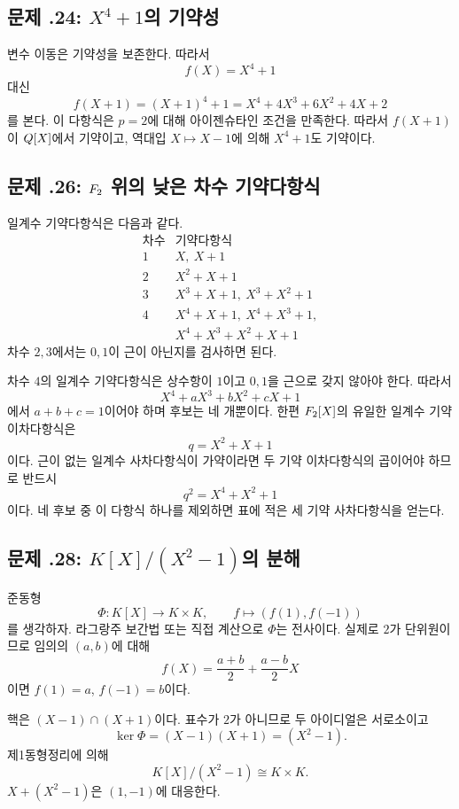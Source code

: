 \subsection*{문제 \thechapter.24: $X^4+1$의 기약성}

\begin{solution}
변수 이동은 기약성을 보존한다. 따라서
\[
 f(X)=X^4+1
\]
대신
\[
 f(X+1)=(X+1)^4+1
 =X^4+4X^3+6X^2+4X+2
\]
를 본다. 이 다항식은 $p=2$에 대해 아이젠슈타인 조건을 만족한다. 따라서 $f(X+1)$이 $Q[X]$에서 기약이고, 역대입 $X\mapsto X-1$에 의해 $X^4+1$도 기약이다.
\end{solution}

\subsection*{문제 \thechapter.26: $F_2$ 위의 낮은 차수 기약다항식}

\begin{solution}
일계수 기약다항식은 다음과 같다.
\[
\begin{array}{c|l}
\text{차수}&\text{기약다항식}\\
\hline
1&X,\ X+1\\
2&X^2+X+1\\
3&X^3+X+1,\ X^3+X^2+1\\
4&X^4+X+1,\ X^4+X^3+1,\\
 &X^4+X^3+X^2+X+1
\end{array}
\]
차수 $2,3$에서는 $0,1$이 근이 아닌지를 검사하면 된다.

차수 $4$의 일계수 기약다항식은 상수항이 $1$이고 $0,1$을 근으로 갖지 않아야 한다. 따라서
\[
  X^4+aX^3+bX^2+cX+1
\]
에서 $a+b+c=1$이어야 하며 후보는 네 개뿐이다. 한편 $F_2[X]$의 유일한 일계수 기약 이차다항식은
\[
  q=X^2+X+1
\]
이다. 근이 없는 일계수 사차다항식이 가약이라면 두 기약 이차다항식의 곱이어야 하므로 반드시
\[
  q^2=X^4+X^2+1
\]
이다. 네 후보 중 이 다항식 하나를 제외하면 표에 적은 세 기약 사차다항식을 얻는다.
\end{solution}

\subsection*{문제 \thechapter.28: $K[X]/(X^2-1)$의 분해}

\begin{solution}
준동형
\[
 \Phi:K[X]\to K\times K,
 \qquad f\mapsto(f(1),f(-1))
\]
를 생각하자. 라그랑주 보간법 또는 직접 계산으로 $\Phi$는 전사이다. 실제로 $2$가 단위원이므로 임의의 $(a,b)$에 대해
\[
 f(X)=\frac{a+b}{2}+\frac{a-b}{2}X
\]
이면 $f(1)=a$, $f(-1)=b$이다.

핵은 $(X-1)\cap(X+1)$이다. 표수가 $2$가 아니므로 두 아이디얼은 서로소이고
\[
 \ker\Phi=(X-1)(X+1)=(X^2-1).
\]
제1동형정리에 의해
\[
 K[X]/(X^2-1)\cong K\times K.
\]
$X+(X^2-1)$은 $(1,-1)$에 대응한다.
\end{solution}

